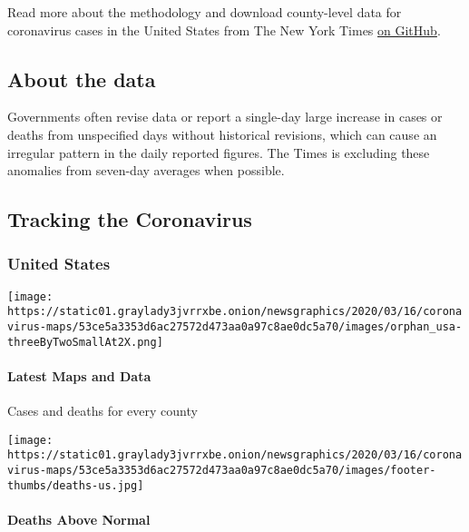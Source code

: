 Read more about the methodology and download county-level data for
coronavirus cases in the United States from The New York Times
\href{https://github.com/nytimes/covid-19-data}{on GitHub}.

\hypertarget{about-the-data}{%
\subsection{About the data}\label{about-the-data}}

Governments often revise data or report a single-day large increase in
cases or deaths from unspecified days without historical revisions,
which can cause an irregular pattern in the daily reported figures. The
Times is excluding these anomalies from seven-day averages when
possible.

\hypertarget{tracking-the-coronavirus}{%
\subsection{Tracking the Coronavirus}\label{tracking-the-coronavirus}}

\hypertarget{united-states-1}{%
\subsubsection{United States}\label{united-states-1}}

\href{https://www.nytimes3xbfgragh.onion/interactive/2020/us/coronavirus-us-cases.html}{}

\texttt{[image: https://static01.graylady3jvrrxbe.onion/newsgraphics/2020/03/16/coronavirus-maps/53ce5a3353d6ac27572d473aa0a97c8ae0dc5a70/images/orphan\_usa-threeByTwoSmallAt2X.png]}

\hypertarget{latest-maps-and-data}{%
\paragraph{Latest Maps and Data}\label{latest-maps-and-data}}

Cases and deaths for every county

\href{https://www.nytimes3xbfgragh.onion/interactive/2020/05/05/us/coronavirus-death-toll-us.html}{}

\texttt{[image: https://static01.graylady3jvrrxbe.onion/newsgraphics/2020/03/16/coronavirus-maps/53ce5a3353d6ac27572d473aa0a97c8ae0dc5a70/images/footer-thumbs/deaths-us.jpg]}

\hypertarget{deaths-above-normal}{%
\paragraph{Deaths Above Normal}\label{deaths-above-normal}}

